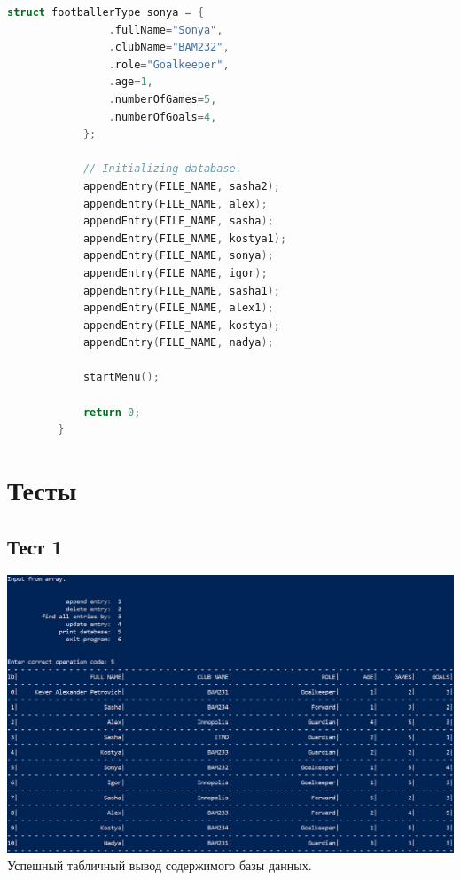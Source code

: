 \documentclass[12pt]{article}
\begin{document}
\begin{lstlisting}[language=C]
			struct footballerType sonya = {
				.fullName="Sonya",
				.clubName="BAM232",
				.role="Goalkeeper",
				.age=1,
				.numberOfGames=5,
				.numberOfGoals=4,
			};
			
			// Initializing database.
			appendEntry(FILE_NAME, sasha2);
			appendEntry(FILE_NAME, alex);
			appendEntry(FILE_NAME, sasha);
			appendEntry(FILE_NAME, kostya1);
			appendEntry(FILE_NAME, sonya);
			appendEntry(FILE_NAME, igor);
			appendEntry(FILE_NAME, sasha1);
			appendEntry(FILE_NAME, alex1);
			appendEntry(FILE_NAME, kostya);
			appendEntry(FILE_NAME, nadya);
			
			startMenu();
			
			return 0;
		}
	\end{lstlisting}
	
	\newpage
	
	\section{Тесты}
	
	\subsection{Тест 1}
	\includegraphics[width=1\linewidth]{test_1.png} \newline
	Успешный табличный вывод содержимого базы данных.
	
\end{document}
